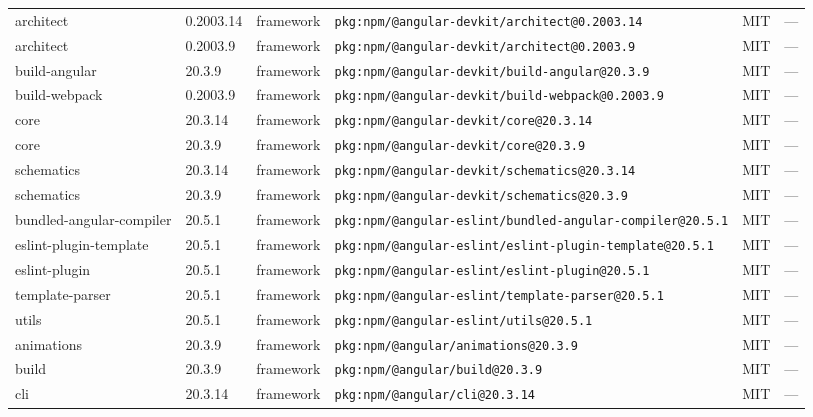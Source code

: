 \documentclass[11pt,a4paper]{article}
\begin{document}
\begin{longtable}{|p{4cm}|p{2cm}|p{1.6cm}|p{5cm}|p{1.5cm}|p{3.5cm}|}
\raggedright architect & 0.2003.14 & framework & \small\texttt{pkg:npm/@angular-devkit/architect@0.2003.14} & MIT & \small — \\
\raggedright architect & 0.2003.9 & framework & \small\texttt{pkg:npm/@angular-devkit/architect@0.2003.9} & MIT & \small — \\
\raggedright build-angular & 20.3.9 & framework & \small\texttt{pkg:npm/@angular-devkit/build-angular@20.3.9} & MIT & \small — \\
\raggedright build-webpack & 0.2003.9 & framework & \small\texttt{pkg:npm/@angular-devkit/build-webpack@0.2003.9} & MIT & \small — \\
\raggedright core & 20.3.14 & framework & \small\texttt{pkg:npm/@angular-devkit/core@20.3.14} & MIT & \small — \\
\raggedright core & 20.3.9 & framework & \small\texttt{pkg:npm/@angular-devkit/core@20.3.9} & MIT & \small — \\
\raggedright schematics & 20.3.14 & framework & \small\texttt{pkg:npm/@angular-devkit/schematics@20.3.14} & MIT & \small — \\
\raggedright schematics & 20.3.9 & framework & \small\texttt{pkg:npm/@angular-devkit/schematics@20.3.9} & MIT & \small — \\
\raggedright bundled-angular-compiler & 20.5.1 & framework & \small\texttt{pkg:npm/@angular-eslint/bundled-angular-compiler@20.5.1} & MIT & \small — \\
\raggedright eslint-plugin-template & 20.5.1 & framework & \small\texttt{pkg:npm/@angular-eslint/eslint-plugin-template@20.5.1} & MIT & \small — \\
\raggedright eslint-plugin & 20.5.1 & framework & \small\texttt{pkg:npm/@angular-eslint/eslint-plugin@20.5.1} & MIT & \small — \\
\raggedright template-parser & 20.5.1 & framework & \small\texttt{pkg:npm/@angular-eslint/template-parser@20.5.1} & MIT & \small — \\
\raggedright utils & 20.5.1 & framework & \small\texttt{pkg:npm/@angular-eslint/utils@20.5.1} & MIT & \small — \\
\raggedright animations & 20.3.9 & framework & \small\texttt{pkg:npm/@angular/animations@20.3.9} & MIT & \small — \\
\raggedright build & 20.3.9 & framework & \small\texttt{pkg:npm/@angular/build@20.3.9} & MIT & \small — \\
\raggedright cli & 20.3.14 & framework & \small\texttt{pkg:npm/@angular/cli@20.3.14} & MIT & \small — \\

\end{longtable}
\end{document}
